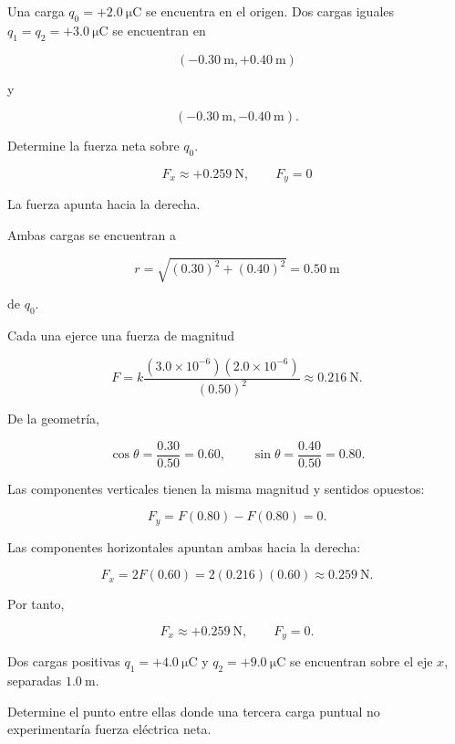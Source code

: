 \begin{ejercicio}
Una carga \(q_0=+\SI{2.0}{\micro\coulomb}\) se encuentra en el origen.
Dos cargas iguales \(q_1=q_2=+\SI{3.0}{\micro\coulomb}\) se encuentran en

\[
(-\SI{0.30}{\metre},+\SI{0.40}{\metre})
\]

y

\[
(-\SI{0.30}{\metre},-\SI{0.40}{\metre}).
\]

Determine la fuerza neta sobre \(q_0\).
\end{ejercicio}

\begin{respuesta}
\[
\boxed{F_x\approx+\SI{0.259}{\newton}}, \qquad
\boxed{F_y=0}
\]

La fuerza apunta hacia la derecha.
\end{respuesta}

\begin{explicacion}
Ambas cargas se encuentran a

\[
r=\sqrt{(0.30)^2+(0.40)^2}=\SI{0.50}{\metre}
\]

de \(q_0\).

Cada una ejerce una fuerza de magnitud

\[
F=k\frac{(3.0\times10^{-6})(2.0\times10^{-6})}{(0.50)^2}
\approx\SI{0.216}{\newton}.
\]

De la geometría,

\[
\cos\theta=\frac{0.30}{0.50}=0.60, \qquad
\sin\theta=\frac{0.40}{0.50}=0.80.
\]

Las componentes verticales tienen la misma magnitud y sentidos opuestos:

\[
F_y=F(0.80)-F(0.80)=0.
\]

Las componentes horizontales apuntan ambas hacia la derecha:

\[
F_x=2F(0.60)=2(0.216)(0.60)
\approx\SI{0.259}{\newton}.
\]

Por tanto,

\[
\boxed{F_x\approx+\SI{0.259}{\newton}}, \qquad
\boxed{F_y=0}.
\]
\end{explicacion}


\begin{ejercicio}
Dos cargas positivas \(q_1=+\SI{4.0}{\micro\coulomb}\) y
\(q_2=+\SI{9.0}{\micro\coulomb}\) se encuentran sobre el eje \(x\),
separadas \(\SI{1.0}{\metre}\).

Determine el punto entre ellas donde una tercera carga puntual no
experimentaría fuerza eléctrica neta.
\end{ejercicio}

